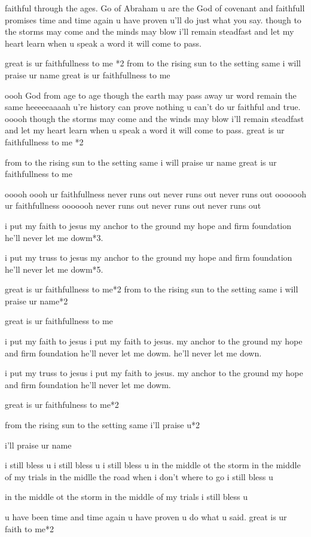 \documentclass{article}
\begin{document}
faithful through the ages.
Go of Abraham
u are the God of covenant
and faithfull promises 
 time and time again
u have proven
u'll do just what you say.
though to the storms may come
and the minds may blow 
i'll remain steadfast
and let my heart learn when u speak a word
it will come to pass.

great is ur faithfullness to me *2
from to the rising sun to the setting same i will praise ur name
great is ur faithfullness to me 

oooh 
God from age to age
though the earth may pass away
ur word remain the same 
heeeeeaaaah 
u're history can prove nothing u can't do 
ur faithful and true. 
ooooh though the storms may come
and the winds may blow 
i'll remain steadfast
and let my heart learn when u speak a word
it will come to pass.
great is ur faithfullness to me *2

from to the rising sun to the setting same i will praise ur name
great is ur faithfullness to me 

ooooh oooh ur faithfullness
never runs out 
never runs out
never runs out 
ooooooh ur faithfullness
ooooooh
never runs out
never runs out 
never runs out

 i put my faith to jesus my anchor to the ground
 my hope and firm foundation he'll never let me dowm*3. 

 i put my truss to jesus my anchor to the ground
 my hope and firm foundation he'll never let me dowm*5.

great is ur faithfullness to me*2 
from to the rising sun to the setting same i will praise ur name*2

great is ur faithfullness to me 


 i put my faith to jesus i put my faith to jesus. my anchor to the ground
 my hope and firm foundation he'll never let me dowm. he'll never let me down.

 i put my truss to jesus i put my faith to jesus. my anchor to the ground
 my hope and firm foundation he'll never let me dowm.

great is ur faithfulness to me*2

from the rising sun to the setting same i'll praise u*2

i'll praise ur name 

i still bless u 
i still bless u 
i still bless u 
in the middle ot the storm
in the middle of my trials
in the midlle the road when i don't where to go 
i still bless u

in the middle ot the storm
in the middle of my trials
i still bless u

u have been  
time and time again u have proven u do what u said. 
great is ur faith to me*2
\end{document}
